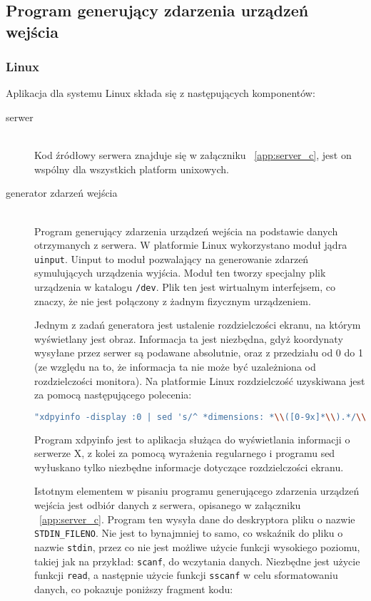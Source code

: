 \subsection{Program generujący zdarzenia urządzeń wejścia}
\label{sub:impl-displayclient-events-dispatcher}

\subsubsection{Linux}
Aplikacja dla systemu Linux składa się z następujących komponentów: 
\begin{description}
	\item[serwer] \hfill \\
Kod źródłowy serwera znajduje się w załączniku ~\ref{app:server_c}, jest on wspólny dla wszystkich platform unixowych.		
	\item[generator zdarzeń wejścia] \hfill \\ 
		Program generujący zdarzenia urządzeń wejścia na podstawie danych otrzymanych z serwera. W platformie Linux wykorzystano moduł jądra \lstinline{uinput}. Uinput to moduł pozwalający na generowanie zdarzeń symulujących urządzenia wyjścia. Moduł ten tworzy specjalny plik urządzenia w katalogu \lstinline{/dev}. Plik ten jest wirtualnym interfejsem, co znaczy, że nie jest połączony z żadnym fizycznym urządzeniem.

		Jednym z zadań generatora jest ustalenie rozdzielczości ekranu, na którym wyświetlany jest obraz. Informacja ta jest niezbędna, gdyż koordynaty wysyłane przez serwer są podawane absolutnie, oraz z przedziału od 0 do 1 (ze względu na to, że informacja ta nie może być uzależniona od rozdzielczości monitora). Na platformie Linux rozdzielczość uzyskiwana jest za pomocą następującego polecenia:
\begin{lstlisting}[language=bash]
"xdpyinfo -display :0 | sed 's/^ *dimensions: *\\([0-9x]*\\).*/\\1/;t;d'";
\end{lstlisting}
		Program xdpyinfo jest to aplikacja służąca do wyświetlania informacji o serwerze X, z kolei za pomocą wyrażenia regularnego i programu sed wyłuskano tylko niezbędne informacje dotyczące rozdzielczości ekranu.

		Istotnym elementem w pisaniu programu generującego zdarzenia urządzeń wejścia jest odbiór danych z serwera, opisanego w załączniku ~\ref{app:server_c}. Program ten wysyła dane do deskryptora pliku o nazwie \lstinline{STDIN_FILENO}. Nie jest to bynajmniej to samo, co wskaźnik do pliku o nazwie \lstinline{stdin}, przez co nie jest możliwe użycie funkcji wysokiego poziomu, takiej jak na przykład: \lstinline{scanf}, do wczytania danych. Niezbędne jest użycie funkcji \lstinline{read}, a następnie użycie funkcji \lstinline{sscanf} w celu sformatowaniu danych, co pokazuje poniższy fragment kodu:


\end{description}
